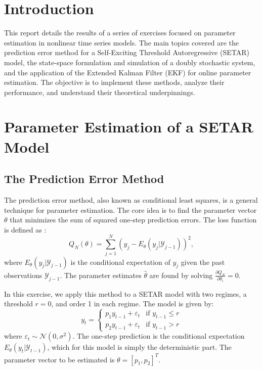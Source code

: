 \documentclass[11pt, a4paper]{article}
\begin{document}


\tableofcontents
\newpage

\section{Introduction}
This report details the results of a series of exercises focused on parameter estimation in nonlinear time series models. The main topics covered are the prediction error method for a Self-Exciting Threshold Autoregressive (SETAR) model, the state-space formulation and simulation of a doubly stochastic system, and the application of the Extended Kalman Filter (EKF) for online parameter estimation. The objective is to implement these methods, analyze their performance, and understand their theoretical underpinnings.

\section{Parameter Estimation of a SETAR Model}
\subsection{The Prediction Error Method}
The prediction error method, also known as conditional least squares, is a general technique for parameter estimation. The core idea is to find the parameter vector $\theta$ that minimizes the sum of squared one-step prediction errors. The loss function is defined as \citep{tong1990nonlinear}:
\begin{equation}
    Q_N(\theta) = \sum_{j=1}^{N} (y_j - E_\theta(y_j|\mathcal{Y}_{j-1}))^2,
\end{equation}
where $E_\theta(y_j|\mathcal{Y}_{j-1})$ is the conditional expectation of $y_j$ given the past observations $\mathcal{Y}_{j-1}$. The parameter estimates $\hat{\theta}$ are found by solving $\frac{\partial Q_N}{\partial \theta_i} = 0$.

In this exercise, we apply this method to a SETAR model with two regimes, a threshold $r=0$, and order 1 in each regime. The model is given by:
\begin{equation}
y_t = 
\begin{cases}
    p_1 y_{t-1} + \varepsilon_t & \text{if } y_{t-1} \le r \\
    p_2 y_{t-1} + \varepsilon_t & \text{if } y_{t-1} > r
\end{cases}
\end{equation}
where $\varepsilon_t \sim \mathcal{N}(0, \sigma^2)$. The one-step prediction is the conditional expectation $E_\theta(y_t|\mathcal{Y}_{t-1})$, which for this model is simply the deterministic part. The parameter vector to be estimated is $\theta = [p_1, p_2]^T$.
\end{document}
